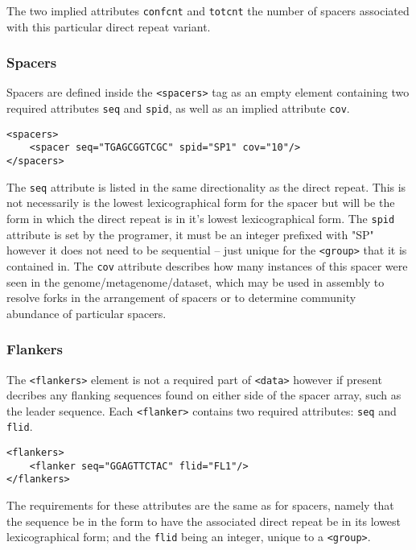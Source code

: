 \documentclass[11pt]{article} %
\begin{document}
The two implied attributes \lstinline[language=XML_new]$confcnt$ and \lstinline[language=XML_new]$totcnt$
the number of spacers associated with this particular direct repeat variant.
\subsubsection{Spacers}
Spacers are defined inside the \lstinline[language=XML_new]$<spacers>$ tag as an empty element containing two required attributes \lstinline[language=XML_new]$seq$ and \lstinline[language=XML_new]$spid$, as well as an implied attribute \lstinline[language=XML_new]$cov$.
\begin{lstlisting}[language=XML_new]
<spacers>
	<spacer seq="TGAGCGGTCGC" spid="SP1" cov="10"/>
</spacers>
\end{lstlisting}
The \lstinline[language=XML_new]$seq$ attribute is listed in the same directionality as the direct repeat.  This is not necessarily is the lowest lexicographical form for the spacer but will be the form in which the direct repeat is in it's lowest lexicographical form.  The \lstinline[language=XML_new]$spid$ attribute is set by the programer, it must be an integer prefixed with "SP" however it does not need to be sequential -- just unique for the \lstinline[language=XML_new]$<group>$ that it is contained in.  The \lstinline[language=XML_new]$cov$ attribute describes how many instances of this spacer were seen in the genome/metagenome/dataset, which may be used in assembly to resolve forks in the arrangement of spacers or to determine community abundance of particular spacers. 
\subsubsection{Flankers}
The \lstinline[language=XML_new]$<flankers>$ element is not a required part of \lstinline[language=XML_new]$<data>$ however if present decribes any flanking sequences found on either side of the spacer array, such as the leader sequence. Each \lstinline[language=XML_new]$<flanker>$ contains two required attributes: \lstinline[language=XML_new]$seq$ and \lstinline[language=XML_new]$flid$.
\begin{lstlisting}[language=XML_new]
<flankers>
	<flanker seq="GGAGTTCTAC" flid="FL1"/>
</flankers>
\end{lstlisting}
The requirements for these attributes are the same as for spacers, namely that the sequence be in the form to have the associated direct repeat be in its lowest lexicographical form; and the \lstinline[language=XML_new]$flid$ being an integer, unique to a \lstinline[language=XML_new]$<group>$.
\end{document}
